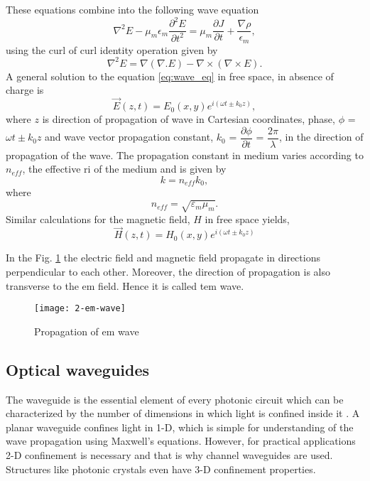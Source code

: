 \documentclass[../report.tex]{subfiles}
\begin{document}
\noindent These equations combine into the following wave equation
\begin{equation}\label{eq:wave_eq}
\nabla^2 E -  \mu_m\epsilon_m\frac{\partial^2 E}{\partial t^2} = \mu_m\frac{\partial J}{\partial t} + \frac{\nabla\rho}{\epsilon_m},	
\end{equation}
using the curl of curl identity operation given by 
\begin{equation}\label{eq:curl_of_curl}
\nabla^2 E = \nabla(\nabla.E) - \nabla\times(\nabla\times E).
\end{equation}
A general solution to the equation \ref{eq:wave_eq} in free space, in absence of charge is
\begin{equation}\label{eq:wave_sol_electric}
\overrightarrow{E}(z,t)=E_{0}(x,y)e^{i\left(\omega t \pm k_{0}z\right)},
\end{equation}
where $z$ is direction of propagation of wave in Cartesian coordinates, phase, $\phi$ = $\omega t \pm k_{0}z$ and wave vector propagation constant, $k_0$ = $\dfrac {\partial \phi } {\partial t}$ = $\dfrac {2\pi } {\lambda }$, in the direction of propagation of the wave. The propagation constant in medium varies according to $n_{eff}$, the effective \gls{ri} of the medium and is given by 
\begin{equation}\label{eq:propagation_const_med_val}
k = n_{eff}k_0,
\end{equation}
where
\begin{equation}\label{eq:ri_med_val}
n_{eff} = \sqrt {\varepsilon _{m}\mu _{m}}.
\end{equation}
Similar calculations for the magnetic field, $H$ in free space yields, 		
\begin{equation}\label{eq:wave_sol_magnetic}
\overrightarrow{H}(z,t)=H_{0}(x,y)e^{i\left(\omega t \pm k_{0}z\right)}
\end{equation}

\noindent In the Fig. \ref{fig:2_em_wave} the electric field and magnetic field propagate in directions perpendicular to each other. Moreover, the direction of propagation is also transverse to the \gls{em} field. Hence it is called \gls{tem} wave.
\begin{figure}[H]
	\centering
	\texttt{[image: 2-em-wave]}
	\caption{Propagation of \gls{em} wave}
	\label{fig:2_em_wave}
\end{figure}
		\subsection{Optical waveguides}
The waveguide is the essential element of every photonic circuit which can be characterized by the number of dimensions in which light is confined inside it \cite{reed_silicon_2008}. A planar waveguide confines light in 1-D, which is simple for understanding of the wave propagation using Maxwell's equations. However, for practical applications 2-D confinement is necessary and that is why channel waveguides are used. Structures like photonic crystals even have 3-D confinement properties.   			
\end{document}
